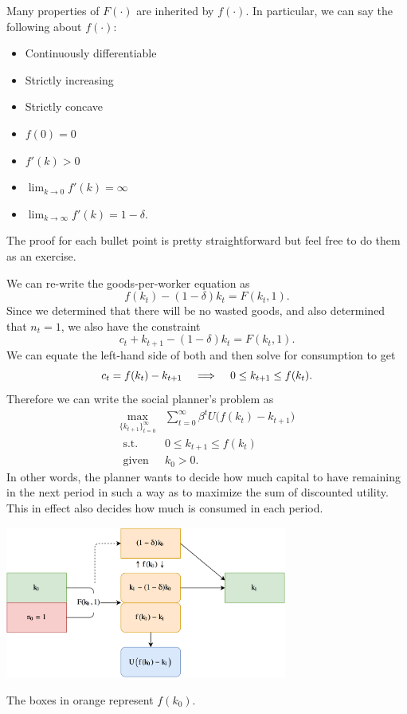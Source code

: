 \documentclass[12pt]{article}
\newcommand{\Lindent}{\hspace{.4cm} \Longrightarrow \hspace{.4cm}}
\theoremstyle{definition}
\begin{document}
Many properties of $F(\cdot)$ are inherited by $f(\cdot)$. In particular, we can say the following about $f(\cdot)$: 
\begin{itemize}
	\itemsep0em
	\item Continuously differentiable
	\item Strictly increasing
	\item Strictly concave
	\item $f(0)=0$
	\item $f'(k) >0$
	\item $\lim_{k \rightarrow 0} f'(k)=\infty$
	\item $\lim_{k \rightarrow \infty} f'(k)=1 - \delta$.
\end{itemize}
The proof for each bullet point is pretty straightforward but feel free to do them as an exercise.


We can re-write the goods-per-worker equation as 
	\[f(k_t) - (1 - \delta)k_t = F(k_t,1).\]
Since we determined that there will be no wasted goods, and also determined that $n_t=1$, we also have the constraint 
	\[c_t + k_{t+1} - (1 - \delta)k_t = F(k_t, 1).\]
We can equate the left-hand side of both and then solve for consumption to get
	\[c_t =  f(k_t) - k_{t + 1} \Lindent 0 \leq k_{t+1} \leq f(k_t).	\]
Therefore we can write the social planner's problem as
\begin{align}
	\max_{ \{k_{t+1} \}_{t =0}^{\infty} } &\sum_{t = 0}^{\infty} \beta^t U\big( f(k_t) - k_{t + 1} \big) \label{spobjective}\\
	\text{ s.t. } \;\; &0 \leq k_{t+1} \leq f(k_t) \label{spcond}\\
	\text{ given} \;\; &k_0 > 0.
\end{align}
In other words, the planner wants to decide how much capital to have remaining in the next period in such a way as to maximize the sum of discounted utility. This in effect also decides how much is consumed in each period. 
		\begin{center}
			\includegraphics[width=350px]{01-growth2.png}
			
\small	The boxes in orange represent $f(k_0)$.
		\end{center} 
\end{document}
